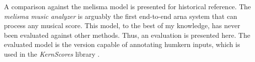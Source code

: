
A comparison against the \gls{melisma} model is presented
for historical reference. The \emph{melisma music analyzer}
is arguably the first end-to-end \gls{arna} system that can
process any musical score.  This model, to the best of my
knowledge, has never been evaluated against other methods.
Thus, an evaluation is presented here. The evaluated model
is the version capable of annotating \gls{humkern} inputs,
which is used in the \emph{KernScores} library
\parencite{sapp2005online}.
